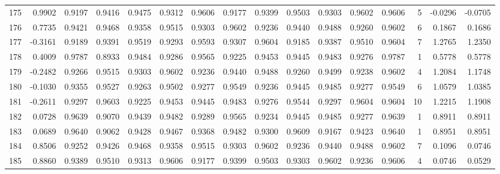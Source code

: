 \begin{tabular}{lrrrrrrrrrrrrrrr}
175 &      0.9902 &  0.9197 &  0.9416 &  0.9475 &  0.9312 &  0.9606 &  0.9177 &  0.9399 &  0.9503 &  0.9303 &   0.9602 &     0.9606 &      5 &                   -0.0296 &                    -0.0705 \\
176 &      0.7735 &  0.9421 &  0.9468 &  0.9358 &  0.9515 &  0.9303 &  0.9602 &  0.9236 &  0.9440 &  0.9488 &   0.9260 &     0.9602 &      6 &                    0.1867 &                     0.1686 \\
177 &     -0.3161 &  0.9189 &  0.9391 &  0.9519 &  0.9293 &  0.9593 &  0.9307 &  0.9604 &  0.9185 &  0.9387 &   0.9510 &     0.9604 &      7 &                    1.2765 &                     1.2350 \\
178 &      0.4009 &  0.9787 &  0.8933 &  0.9484 &  0.9286 &  0.9565 &  0.9225 &  0.9453 &  0.9445 &  0.9483 &   0.9276 &     0.9787 &      1 &                    0.5778 &                     0.5778 \\
179 &     -0.2482 &  0.9266 &  0.9515 &  0.9303 &  0.9602 &  0.9236 &  0.9440 &  0.9488 &  0.9260 &  0.9499 &   0.9238 &     0.9602 &      4 &                    1.2084 &                     1.1748 \\
180 &     -0.1030 &  0.9355 &  0.9527 &  0.9263 &  0.9502 &  0.9277 &  0.9549 &  0.9236 &  0.9445 &  0.9485 &   0.9277 &     0.9549 &      6 &                    1.0579 &                     1.0385 \\
181 &     -0.2611 &  0.9297 &  0.9603 &  0.9225 &  0.9453 &  0.9445 &  0.9483 &  0.9276 &  0.9544 &  0.9297 &   0.9604 &     0.9604 &     10 &                    1.2215 &                     1.1908 \\
182 &      0.0728 &  0.9639 &  0.9070 &  0.9439 &  0.9482 &  0.9289 &  0.9565 &  0.9234 &  0.9445 &  0.9485 &   0.9277 &     0.9639 &      1 &                    0.8911 &                     0.8911 \\
183 &      0.0689 &  0.9640 &  0.9062 &  0.9428 &  0.9467 &  0.9368 &  0.9482 &  0.9300 &  0.9609 &  0.9167 &   0.9423 &     0.9640 &      1 &                    0.8951 &                     0.8951 \\
184 &      0.8506 &  0.9252 &  0.9426 &  0.9468 &  0.9358 &  0.9515 &  0.9303 &  0.9602 &  0.9236 &  0.9440 &   0.9488 &     0.9602 &      7 &                    0.1096 &                     0.0746 \\
185 &      0.8860 &  0.9389 &  0.9510 &  0.9313 &  0.9606 &  0.9177 &  0.9399 &  0.9503 &  0.9303 &  0.9602 &   0.9236 &     0.9606 &      4 &                    0.0746 &                     0.0529 \\

\end{tabular}
